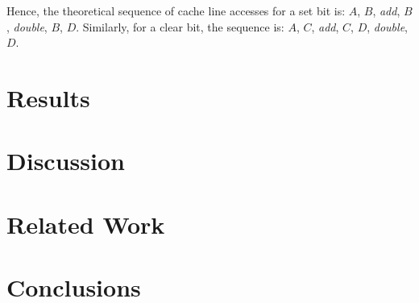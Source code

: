 \documentclass{llncs}
\begin{document}
Hence, the theoretical sequence of cache line accesses for a set bit is: $A$, $B$, \textit{add}, $B$, \textit{double}, $B$, $D$.
Similarly, for a clear bit, the sequence is: $A$, $C$, \textit{add}, $C$, $D$, \textit{double}, $D$.

\section{Results}
\section{Discussion}
\section{Related Work}
\section{Conclusions}


\end{document}
